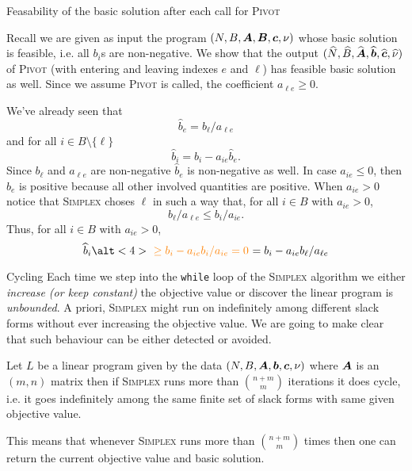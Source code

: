 \documentclass[32pt, aspectratio = 169]{beamer}
\begin{document}
\begin{frame}{Feasability of the basic solution after each call for \textsc{Pivot}}
    \setlength\columnseprule{.1pt}
    \begin{multicols}{2}
        Recall we are given as input the program $(N, B, \boldsymbol{A}, \boldsymbol{B}, \boldsymbol{c}, \nu)$ whose basic solution is feasible, i.e. all $b_i$s are non-negative. We show that the output $(\widehat{N}, \widehat{B}, \widehat{\boldsymbol{A}}, \widehat{\boldsymbol{b}}, \widehat{\boldsymbol{c}}, \widehat{\nu})$ of \textsc{Pivot} (with entering and leaving indexes $e$ and $\ell$) has feasible basic solution as well. Since we assume \textsc{Pivot} is called, the coefficient $a_{\ell e} \geq 0$.

        \pause
        We've already seen that
        \[
        \widehat{b}_e = b_\ell / a_{\ell e}
        \]
        and for all $i \in B\setminus \{\ell\}$
        \[
        \widehat{b}_i = b_i - a_{ie}\widehat{b}_e.
        \]
        Since $b_\ell$ and $a_{\ell e}$ are non-negative $\widehat{b}_e$ is non-negative as well. In case $a_{ie} \leq 0$, then $\widehat{b}_e$ is positive because all other involved quantities are positive. \pause When $a_{ie} > 0$ notice that \textsc{Simplex} choses $\ell$ in such a way that, for all $i  \in B$ with $a_{ie} > 0$,
        \[
        b_\ell/a_{\ell e} \leq b_i/a_{i e}.
        \]
        Thus, for all $i \in B$ with $a_{ie} > 0$,
        \[
        \widehat{b}_i \alt<4>{\textcolor{orange}{~\geq b_i - a_{ie}b_i/a_{ie} = 0}}{~ = b_i-a_{ie}b_\ell/a_{\ell e}}
        \]
    \end{multicols}
\end{frame}

\begin{frame}{Cycling}
    Each time we step into the \texttt{while} loop of the \textsc{Simplex} algorithm we either \textit{increase (or keep constant)} the objective value or discover the linear program is \textit{unbounded}. A priori, \textsc{Simplex} might run on indefinitely among different slack forms without ever increasing the objective value. We are going to make clear that such behaviour can be either detected or avoided.
    \begin{prop}[\textbf{C}]
        Let $L$ be a linear program given by the data $(N, B, \boldsymbol{A}, \boldsymbol{b}, \boldsymbol{c}, \nu)$ where $\boldsymbol{A}$ is an $(m, n)$ matrix then if \textsc{Simplex} runs more than $\binom{n+m}{m}$ iterations it does cycle, i.e. it goes indefinitely among the same finite set of slack forms with same given objective value.
    \end{prop}
    \begin{rem}
        This means that whenever \textsc{Simplex} runs more than $\binom{n+m}{m}$ times then one can return the current objective value and basic solution.
    \end{rem}
    \end{frame}
\end{document}
